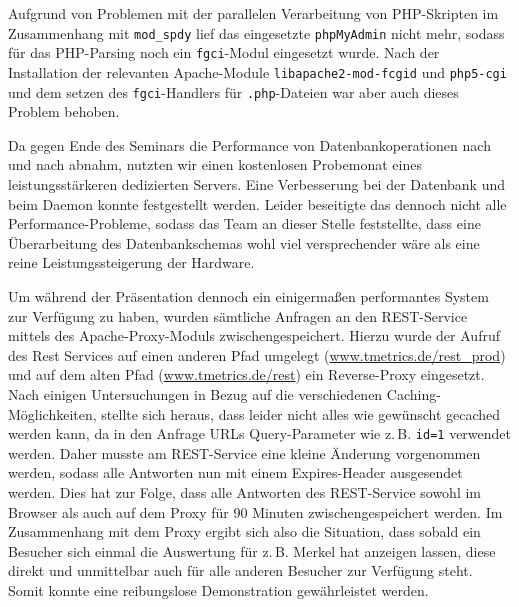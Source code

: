 Aufgrund von Problemen mit der parallelen Verarbeitung von PHP-Skripten im Zusammenhang mit \texttt{mod\_spdy} lief das eingesetzte \texttt{phpMyAdmin} nicht mehr, sodass für das PHP-Parsing noch ein \texttt{fgci}-Modul eingesetzt wurde. Nach der Installation der relevanten Apache-Module \texttt{libapache2-mod-fcgid} und \texttt{php5-cgi} und dem setzen des \texttt{fgci}-Handlers für \texttt{.php}-Dateien war aber auch dieses Problem behoben.

Da gegen Ende des Seminars die Performance von Datenbankoperationen nach und nach abnahm, nutzten wir einen kostenlosen Probemonat eines leistungsstärkeren dedizierten Servers. Eine Verbesserung bei der Datenbank und beim Daemon konnte festgestellt werden. Leider beseitigte das dennoch nicht alle Performance-Probleme, sodass das Team an dieser Stelle feststellte, dass eine Überarbeitung des Datenbankschemas wohl viel versprechender wäre als eine reine Leistungssteigerung der Hardware.

Um während der Präsentation dennoch ein einigermaßen performantes System zur Verfügung zu haben, wurden sämtliche Anfragen an den REST-Service mittels des Apache-Proxy-Moduls zwischengespeichert. Hierzu wurde der Aufruf des Rest Services auf einen anderen Pfad umgelegt (\url{www.tmetrics.de/rest_prod}) und auf dem alten Pfad (\url{www.tmetrics.de/rest}) ein Reverse-Proxy eingesetzt.
Nach einigen Untersuchungen in Bezug auf die verschiedenen Caching-Möglichkeiten, stellte sich heraus, dass leider nicht alles wie gewünscht gecached werden kann, da in den Anfrage URLs Query-Parameter wie z.\,B. \texttt{id=1} verwendet werden. Daher musste am REST-Service eine kleine Änderung vorgenommen werden, sodass alle Antworten nun mit einem Expires-Header ausgesendet werden. Dies hat zur Folge, dass alle Antworten des REST-Service sowohl im Browser als auch auf dem Proxy für 90 Minuten zwischengespeichert werden.
Im Zusammenhang mit dem Proxy ergibt sich also die Situation, dass sobald ein Besucher sich einmal die Auswertung für z.\,B. Merkel hat anzeigen lassen, diese direkt und unmittelbar auch für alle anderen Besucher zur Verfügung steht.
Somit konnte eine reibungslose Demonstration gewährleistet werden.
